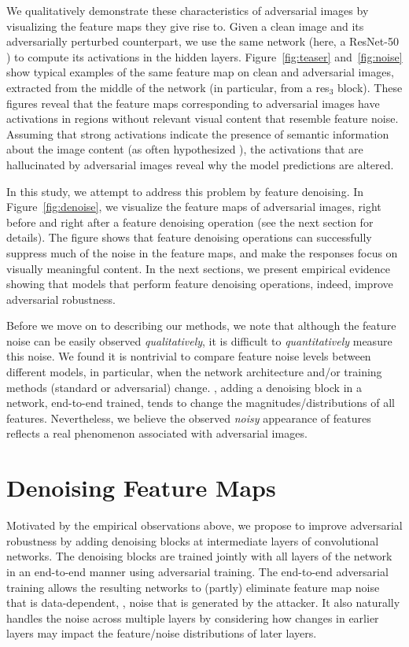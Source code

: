 \documentclass[10pt,twocolumn,letterpaper]{article}
\begin{document}
We qualitatively demonstrate these characteristics of adversarial images by visualizing the feature maps they give rise to. Given a clean image and its adversarially perturbed counterpart, we use the same network (here, a ResNet-50 \cite{He2016}) to compute its activations in the hidden layers. Figure~\ref{fig:teaser} and~\ref{fig:noise} show typical examples of the same feature map on clean and adversarial images, extracted from the middle of the network (in particular, from a res${_3}$ block). These figures reveal that the feature maps corresponding to adversarial images have activations in regions without relevant visual content that resemble feature noise. Assuming that strong activations indicate the presence of semantic information about the image content (as often hypothesized \cite{Zeiler2014}), the activations that are hallucinated by adversarial images reveal why the model predictions are altered.

In this study, we attempt to address this problem by feature denoising. In Figure~\ref{fig:denoise}, we visualize the feature maps of adversarial images, right before and right after a feature denoising operation (see the next section for details). The figure shows that feature denoising operations can successfully suppress much of the noise in the feature maps, and make the responses focus on visually meaningful content. In the next sections, we present empirical evidence showing that models that perform feature denoising operations, indeed, improve adversarial robustness.

Before we move on to describing our methods, we note that although the feature noise can be easily observed \emph{qualitatively}, it is difficult to \emph{quantitatively} measure this noise. We found it is nontrivial to compare feature noise levels between different models, in particular, when the network architecture and/or training methods (standard or adversarial) change. \Eg, adding a denoising block in a network, end-to-end trained, tends to change the magnitudes/distributions of all features. Nevertheless, we believe the observed \emph{noisy} appearance of features reflects a real phenomenon associated with adversarial images.

\section{Denoising Feature Maps}\label{sec:denoise}

Motivated by the empirical observations above, we propose to improve adversarial robustness by adding denoising blocks at intermediate layers of convolutional networks. The denoising blocks are trained jointly with all layers of the network in an end-to-end manner using adversarial training. The end-to-end adversarial training allows the resulting networks to (partly) eliminate feature map noise that is data-dependent, \ie, noise that is generated by the attacker. It also naturally handles the noise across multiple layers by considering how changes in earlier layers may impact the feature/noise distributions of later layers.
\end{document}

